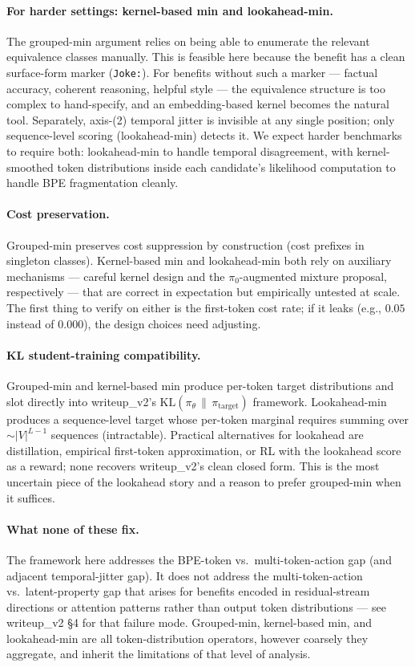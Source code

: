 \documentclass[11pt]{article}
\begin{document}
\paragraph{For harder settings: kernel-based min and lookahead-min.} The grouped-min argument relies on being able to enumerate the relevant equivalence classes manually. This is feasible here because the benefit has a clean surface-form marker (\texttt{Joke:}). For benefits without such a marker — factual accuracy, coherent reasoning, helpful style — the equivalence structure is too complex to hand-specify, and an embedding-based kernel becomes the natural tool. Separately, axis-(2) temporal jitter is invisible at any single position; only sequence-level scoring (lookahead-min) detects it. We expect harder benchmarks to require both: lookahead-min to handle temporal disagreement, with kernel-smoothed token distributions inside each candidate's likelihood computation to handle BPE fragmentation cleanly.

\paragraph{Cost preservation.} Grouped-min preserves cost suppression by construction (cost prefixes in singleton classes). Kernel-based min and lookahead-min both rely on auxiliary mechanisms — careful kernel design and the $\pi_0$-augmented mixture proposal, respectively — that are correct in expectation but empirically untested at scale. The first thing to verify on either is the first-token cost rate; if it leaks (e.g., $0.05$ instead of $0.000$), the design choices need adjusting.

\paragraph{KL student-training compatibility.} Grouped-min and kernel-based min produce per-token target distributions and slot directly into writeup\_v2's $\mathrm{KL}(\pi_\theta \,\|\, \pi_{\mathrm{target}})$ framework. Lookahead-min produces a sequence-level target whose per-token marginal requires summing over $\sim |V|^{L-1}$ sequences (intractable). Practical alternatives for lookahead are distillation, empirical first-token approximation, or RL with the lookahead score as a reward; none recovers writeup\_v2's clean closed form. This is the most uncertain piece of the lookahead story and a reason to prefer grouped-min when it suffices.

\paragraph{What none of these fix.} The framework here addresses the BPE-token vs.\ multi-token-action gap (and adjacent temporal-jitter gap). It does not address the multi-token-action vs.\ latent-property gap that arises for benefits encoded in residual-stream directions or attention patterns rather than output token distributions — see writeup\_v2 \S 4 for that failure mode. Grouped-min, kernel-based min, and lookahead-min are all token-distribution operators, however coarsely they aggregate, and inherit the limitations of that level of analysis.
\end{document}
